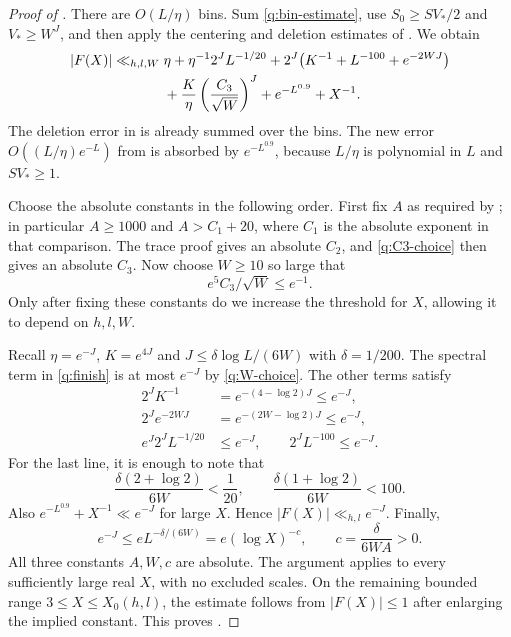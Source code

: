 \begin{proof}[Proof of ]
There are $O(L/\eta)$ bins. Sum \eqref{q:bin-estimate}, use
$S_0\ge SV_*/2$ and $V_*\ge W^J$, and then apply the centering and
deletion estimates of . We obtain
\begin{align}
 |F(X)|\ll_{h,l,W}{}&
 \eta+\eta^{-1}2^J L^{-1/20}
 +2^J\bigl(K^{-1}+L^{-100}+e^{-2WJ}\bigr)\notag\\
 &+\frac K\eta\left(\frac{C_3}{\sqrt W}\right)^J
 +e^{-L^{0.9}}+X^{-1}.
 \label{q:finish}
\end{align}
The deletion error in  is already summed over the bins.
The new error $O((L/\eta)e^{-L})$ from  is absorbed
by $e^{-L^{0.9}}$, because $L/\eta$ is polynomial in $L$ and $SV_*\ge1$.

Choose the absolute constants in the following order. First fix $A$
as required by ; in particular $A\ge1000$ and
$A>C_1+20$, where $C_1$ is the absolute exponent in that comparison.
The trace proof gives an absolute $C_2$, and
\eqref{q:C3-choice} then gives an absolute $C_3$. Now choose $W\ge10$
so large that
\begin{equation}\label{q:W-choice}
 e^5 C_3/\sqrt W\le e^{-1}.
\end{equation}
Only after fixing these constants do we increase the threshold for
$X$, allowing it to depend on $h,l,W$.

Recall $\eta=e^{-J}$, $K=e^{4J}$ and
$J\le\delta\log L/(6W)$ with $\delta=1/200$.
The spectral term in \eqref{q:finish} is at most $e^{-J}$ by
\eqref{q:W-choice}. The other terms satisfy
\begin{align*}
 2^JK^{-1}&=e^{-(4-\log2)J}\le e^{-J},\\
 2^Je^{-2WJ}&=e^{-(2W-\log2)J}\le e^{-J},\\
 e^J2^J L^{-1/20}&\le e^{-J},\qquad
 2^J L^{-100}\le e^{-J}.
\end{align*}
For the last line, it is enough to note that
\[
 \frac{\delta(2+\log2)}{6W}<\frac1{20},\qquad
 \frac{\delta(1+\log2)}{6W}<100.
\]
Also $e^{-L^{0.9}}+X^{-1}\ll e^{-J}$ for large $X$. Hence
$|F(X)|\ll_{h,l}e^{-J}$. Finally,
\[
 e^{-J}\le e L^{-\delta/(6W)}
 =e(\log X)^{-c},\qquad c=\frac{\delta}{6WA}>0.
\]
All three constants $A,W,c$ are absolute. The argument applies to
every sufficiently large real $X$, with no excluded scales. On the
remaining bounded range $3\le X\le X_0(h,l)$, the estimate follows
from $|F(X)|\le1$ after enlarging the implied constant. This proves
.
\end{proof}
